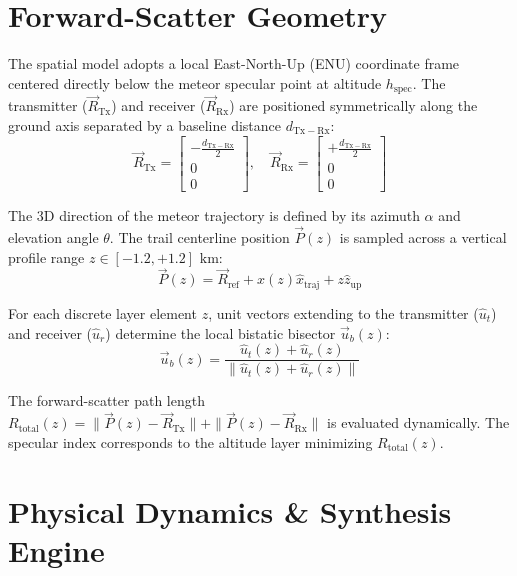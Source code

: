 \documentclass[10pt,twocolumn,a4paper]{article}
\begin{document}
\section{Forward-Scatter Geometry}
The spatial model adopts a local East-North-Up (ENU) coordinate frame centered directly below the meteor specular point at altitude $h_{\mathrm{spec}}$. The transmitter ($\vec{R}_{\mathrm{Tx}}$) and receiver ($\vec{R}_{\mathrm{Rx}}$) are positioned symmetrically along the ground axis separated by a baseline distance $d_{\mathrm{Tx-Rx}}$:
\begin{equation}
\vec{R}_{\mathrm{Tx}} = \begin{bmatrix} -\frac{d_{\mathrm{Tx-Rx}}}{2} \\ 0 \\ 0 \end{bmatrix}, \quad 
\vec{R}_{\mathrm{Rx}} = \begin{bmatrix} +\frac{d_{\mathrm{Tx-Rx}}}{2} \\ 0 \\ 0 \end{bmatrix}
\end{equation}

The 3D direction of the meteor trajectory is defined by its azimuth $\alpha$ and elevation angle $\theta$. The trail centerline position $\vec{P}(z)$ is sampled across a vertical profile range $z \in [-1.2, +1.2]\text{ km}$:
\begin{equation}
\vec{P}(z) = \vec{R}_{\mathrm{ref}} + x(z)\hat{x}_{\mathrm{traj}} + z\hat{z}_{\mathrm{up}}
\end{equation}

For each discrete layer element $z$, unit vectors extending to the transmitter ($\hat{u}_t$) and receiver ($\hat{u}_r$) determine the local bistatic bisector $\vec{u}_b(z)$:
\begin{equation}
\vec{u}_b(z) = \frac{\hat{u}_t(z) + \hat{u}_r(z)}{\|\hat{u}_t(z) + \hat{u}_r(z)\|}
\end{equation}

The forward-scatter path length $R_{\mathrm{total}}(z) = \|\vec{P}(z) - \vec{R}_{\mathrm{Tx}}\| + \|\vec{P}(z) - \vec{R}_{\mathrm{Rx}}\|$ is evaluated dynamically. The specular index corresponds to the altitude layer minimizing $R_{\mathrm{total}}(z)$.

\section{Physical Dynamics \& Synthesis Engine}
\end{document}
